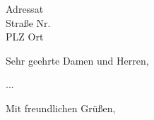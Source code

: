 \documentclass[
	fachschaft,
	a4paper,
	12pt,
	pagesize,
	german
]{scrlttr2}
\begin{document}
\begin{letter}{Adressat\\Straße Nr.\\PLZ Ort}

\opening{Sehr geehrte Damen und Herren,}

...

\closing{Mit freundlichen Grüßen,}




\end{letter}
\end{document}
